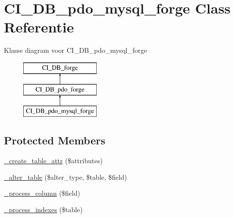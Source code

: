 \hypertarget{class_c_i___d_b__pdo__mysql__forge}{}\section{C\+I\+\_\+\+D\+B\+\_\+pdo\+\_\+mysql\+\_\+forge Class Referentie}
\label{class_c_i___d_b__pdo__mysql__forge}
Klasse diagram voor C\+I\+\_\+\+D\+B\+\_\+pdo\+\_\+mysql\+\_\+forge\begin{figure}[H]
\begin{center}
\leavevmode
\includegraphics[height=3.000000cm]{class_c_i___d_b__pdo__mysql__forge}
\end{center}
\end{figure}
\subsection*{Protected Members}
\begin{DoxyCompactItemize}
\item 
\mbox{\hyperlink{class_c_i___d_b__pdo__mysql__forge_a10b25326d82f6ddd9af1935e52e42b72}{\+\_\+create\+\_\+table\+\_\+attr}} (\$attributes)
\item 
\mbox{\hyperlink{class_c_i___d_b__pdo__mysql__forge_a41c6cae02f2fda8b429ad0afb9509426}{\+\_\+alter\+\_\+table}} (\$alter\+\_\+type, \$table, \$field)
\item 
\mbox{\hyperlink{class_c_i___d_b__pdo__mysql__forge_a8f38f1c5b5dddecca4befbe393f3f299}{\+\_\+process\+\_\+column}} (\$field)
\item 
\mbox{\hyperlink{class_c_i___d_b__pdo__mysql__forge_ae0bdb4ea3418590d1894c5b621b5ca50}{\+\_\+process\+\_\+indexes}} (\$table)
\end{DoxyCompactItemize}
